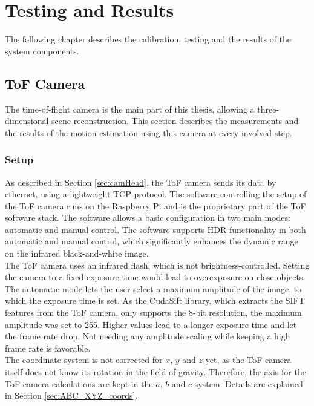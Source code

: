 \chapter{Testing and Results}
\label{sec:Results}
The following chapter describes the calibration, testing and the results of the system components. 
\section{ToF Camera}
The time-of-flight camera is the main part of this thesis, allowing a three-dimensional scene reconstruction. This section describes the measurements and the results of the motion estimation using this camera at every involved step.
\subsection{Setup}
As described in Section \ref{sec:camHead}, the ToF camera sends its data by ethernet, using a lightweight TCP protocol. The software controlling the setup of the ToF camera runs on the Raspberry Pi and is the proprietary part of the ToF software stack. The software allows a basic configuration in two main modes: automatic and manual control. The software supports HDR functionality in both automatic and manual control, which significantly enhances the dynamic range on the infrared black-and-white image.\\ 
The ToF camera uses an infrared flash, which is not brightness-controlled. Setting the camera to a fixed exposure time would lead to overexposure on close objects. The automatic mode lets the user select a maximum amplitude of the image, to which the exposure time is set. As the CudaSift library, which extracts the SIFT features from the ToF camera, only supports the 8-bit resolution, the maximum amplitude was set to 255. Higher values lead to a longer exposure time and let the frame rate drop. Not needing any amplitude scaling while keeping a high frame rate is favorable.\\
The coordinate system is not corrected for $x$, $y$ and $z$ yet, as the ToF camera itself does not know its rotation in the field of gravity. Therefore, the axis for the ToF camera calculations are kept in the $a$, $b$ and $c$ system. Details are explained in Section \ref{sec:ABC_XYZ_coords}.
